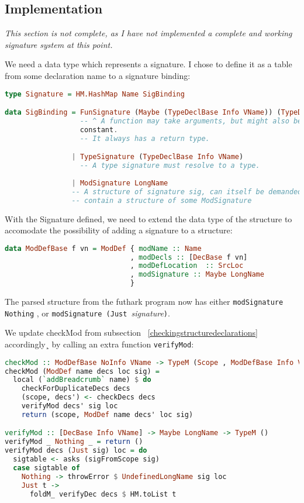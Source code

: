 \subsection{Implementation}
\textit{This section is not complete, as I have not implemented a complete and working
signature system at this point.
}

We need a data type which represents a signature.
I chose to define it as a table from some declaration name to a signature
binding:
\begin{lstlisting}[language=Haskell]
type Signature = HM.HashMap Name SigBinding

data SigBinding = FunSignature (Maybe (TypeDeclBase Info VName)) (TypeDeclBase Info VName)
                  -- ^ A function may take arguments, but might also be a
                  constant.
                  -- It always has a return type.

                | TypeSignature (TypeDeclBase Info VName)
                  -- A type signature must resolve to a type.  
                  
                | ModSignature LongName
                -- A structure of signature sig, can itself be demanded to
                -- contain a structure of some ModSignature
\end{lstlisting}

With the Signature defined, we need to extend the data type of the structure to
accomodate the possibility of adding a signature to a structure:

\begin{lstlisting}[language=Haskell]
data ModDefBase f vn = ModDef { modName :: Name
                              , modDecls :: [DecBase f vn]
                              , modDefLocation  :: SrcLoc
                              , modSignature :: Maybe LongName
                              }
\end{lstlisting}
The parsed structure from the futhark program now has either
\texttt{modSignature Nothing} , or \texttt{modSignature (Just }\textit{signature}\texttt{)}.

We update checkMod from subsection ~\ref{checkingstructuredeclarations} accordingly¸ by
calling an extra function \texttt{verifyMod}:

\begin{lstlisting}[language=Haskell]
checkMod :: ModDefBase NoInfo VName -> TypeM (Scope , ModDefBase Info VName)
checkMod (ModDef name decs loc sig) =
  local (`addBreadcrumb` name) $ do
    checkForDuplicateDecs decs
    (scope, decs') <- checkDecs decs
    verifyMod decs' sig loc
    return (scope, ModDef name decs' loc sig)

verifyMod :: [DecBase Info VName] -> Maybe LongName -> TypeM ()
verifyMod _ Nothing _ = return ()
verifyMod decs (Just sig) loc = do
  sigtable <- asks (sigFromScope sig)
  case sigtable of
    Nothing -> throwError $ UndefinedLongName sig loc
    Just t ->
      foldM_ verifyDec decs $ HM.toList t
\end{lstlisting}

